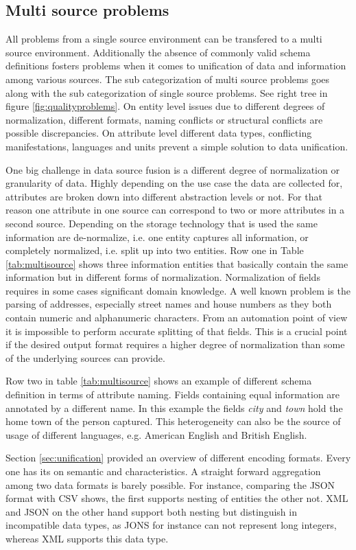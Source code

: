 \subsection{Multi source problems}
All problems from a single source environment can be transfered to a multi source environment. Additionally the absence of commonly valid schema definitions fosters problems when it comes to unification of data and information among various sources. The sub categorization of multi source problems goes along with the sub categorization of single source problems. See right tree in figure \ref{fig:qualityproblems}. On entity level issues due to different degrees of normalization, different formats, naming conflicts or structural conflicts are possible discrepancies. On attribute level different data types, conflicting manifestations, languages and units prevent a simple solution to data unification.

One big challenge in data source fusion is a different degree of normalization or granularity of data. Highly depending on the use case the data are collected for, attributes are broken down into different abstraction levels or not. For that reason one attribute in one source can correspond to two or more attributes in a second source. Depending on the storage technology that is used the same information are de-normalize, i.e. one entity captures all information, or completely normalized, i.e. split up into two entities. Row one in Table \ref{tab:multisource} shows three information entities that basically contain the same information but in different forms of normalization. Normalization of fields requires in some cases significant domain knowledge. A well known problem is the parsing of addresses, especially street names and house numbers as they both contain numeric and alphanumeric characters. From an automation point of view it is impossible to perform accurate splitting of that fields. This is a crucial point if the desired output format requires a higher degree of normalization than some of the underlying sources can provide. 

Row two in table \ref{tab:multisource} shows an example of different schema definition in terms of attribute naming. Fields containing equal information are annotated by a different name. In this example the fields \textit{city} and \textit{town} hold the home town of the person captured. This heterogeneity can also be the source of usage of different languages, e.g. American English and British English. 

Section \ref{sec:unification} provided an overview of different encoding formats. Every one has its on semantic and characteristics. A straight forward aggregation among two data formats is barely possible. For instance, comparing the JSON \cite{json_2017} format with CSV shows, the first supports nesting of entities the other not. XML \cite{xml_2017} and JSON on the other hand support both nesting but distinguish in incompatible data types, as JONS for instance can not represent long integers, whereas XML supports this data type.

